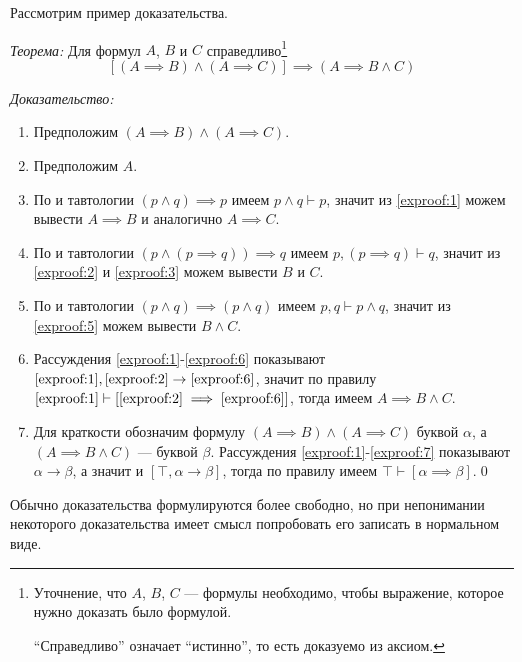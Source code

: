Рассмотрим пример доказательства.

{\it Теорема:} Для формул $A$, $B$ и $C$ справедливо\footnote[][3mm]{
	Уточнение, что $A$, $B$, $C$ --- формулы необходимо, чтобы выражение, которое
	нужно доказать было формулой.

	``Справедливо'' означает ``истинно'', то есть доказуемо из аксиом.
}
\[
	[(A\implies B)\land (A\implies C)]\implies (A\implies B\land C)
\]

{\it Доказательство:}
\begin{enumerate}[label=(\arabic*)]
	\item{}Предположим $(A\implies B)\land (A\implies C)$.\label{exproof:1}

	\item{}Предположим $A$.\label{exproof:2}

	\item{}По \taut{} и тавтологии $(p\land q)\implies p$ имеем
	$p\land q\vdash p$, значит из \ref{exproof:1} можем вывести
	$A\implies B$ и аналогично $A\implies C$.\label{exproof:3}

	\item{}По \taut{} и тавтологии $(p\land (p\implies q))\implies q$
	имеем $p, (p\implies q)\vdash q$, значит из \ref{exproof:2} и
	\ref{exproof:3} можем вывести $B$ и $C$.\label{exproof:5}

	\item{}По \taut{} и тавтологии $(p\land q)\implies(p\land q)$ имеем
	$p,q\vdash p\land q$, значит из \ref{exproof:5} можем вывести $B\land C$.
	\label{exproof:6}

	\item{}Рассуждения \ref{exproof:1}-\ref{exproof:6} показывают
	$\ref{exproof:1},\ref{exproof:2}\to \ref{exproof:6}$, значит по правилу
	\implic{} $\ref{exproof:1}\vdash [\ref{exproof:2}\implies \ref{exproof:6}]$,
	тогда имеем $A\implies B\land C$.\label{exproof:7}

	\item{}Для краткости обозначим формулу
	$(A\implies B)\land (A\implies C)$ буквой $\alpha$,
	а $(A\implies B\land C)$ --- буквой $\beta$.
	Рассуждения \ref{exproof:1}-\ref{exproof:7} показывают $\alpha\to\beta$,
	а значит и $[\top,\alpha\to\beta]$, тогда по правилу \implic{}
	имеем $\top\vdash [\alpha\implies\beta]$.\qed
\end{enumerate}

Обычно доказательства формулируются более свободно,
но при непонимании некоторого доказательства имеет смысл попробовать
его записать в нормальном виде.

